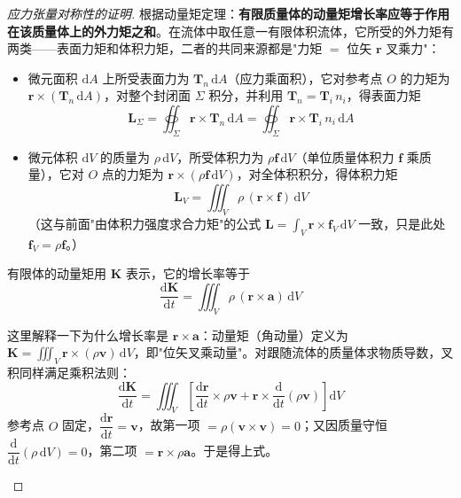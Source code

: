 \begin{proof}[应力张量对称性的证明]
	根据动量矩定理：\textbf{有限质量体的动量矩增长率应等于作用在该质量体上的外力矩之和}。在流体中取任意一有限体积流体，它所受的外力矩有两类——表面力矩和体积力矩，二者的共同来源都是"力矩 $=$ 位矢 $\boldsymbol{r}$ 叉乘力"：
	\begin{itemize}
		\item 微元面积 $\mathrm{d}A$ 上所受表面力为 $\boldsymbol{T}_n\,\mathrm{d}A$（应力乘面积），它对参考点 $O$ 的力矩为 $\boldsymbol{r}\times(\boldsymbol{T}_n\,\mathrm{d}A)$，对整个封闭面 $\Sigma$ 积分，并利用 $\boldsymbol{T}_n=\boldsymbol{T}_i\,n_i$，得表面力矩
		      \begin{equation}\label{eq:surface-moment}
			      \boldsymbol{L}_\Sigma=\oiint_\Sigma\boldsymbol{r}\times\boldsymbol{T}_n\,\mathrm{d}A=\oiint_\Sigma\boldsymbol{r}\times\boldsymbol{T}_i\,n_i\,\mathrm{d}A
		      \end{equation}
		\item 微元体积 $\mathrm{d}V$ 的质量为 $\rho\,\mathrm{d}V$，所受体积力为 $\rho\boldsymbol{f}\,\mathrm{d}V$（单位质量体积力 $\boldsymbol{f}$ 乘质量），它对 $O$ 点的力矩为 $\boldsymbol{r}\times(\rho\boldsymbol{f}\,\mathrm{d}V)$，对全体积积分，得体积力矩
		      \begin{equation}\label{eq:volume-moment}
			      \boldsymbol{L}_V=\iiint_V\rho\,(\boldsymbol{r}\times\boldsymbol{f})\,\mathrm{d}V
		      \end{equation}
		      （这与前面"由体积力强度求合力矩"的公式 $\boldsymbol{L}=\int_V\boldsymbol{r}\times\boldsymbol{f}_V\,\mathrm{d}V$ 一致，只是此处 $\boldsymbol{f}_V=\rho\boldsymbol{f}$。）
	\end{itemize}

	有限体的动量矩用 $\boldsymbol{K}$ 表示，它的增长率等于
	\begin{equation}
		\frac{\mathrm{d}\boldsymbol{K}}{\mathrm{d}t}=\iiint_V\rho\,(\boldsymbol{r}\times\boldsymbol{a})\,\mathrm{d}V
	\end{equation}

	\begin{note}
		这里解释一下为什么增长率是 $\boldsymbol{r}\times\boldsymbol{a}$：动量矩（角动量）定义为 $\boldsymbol{K}=\iiint_V\boldsymbol{r}\times(\rho\boldsymbol{v})\,\mathrm{d}V$，即"位矢叉乘动量"。对跟随流体的质量体求物质导数，叉积同样满足乘积法则：
		\[
		\frac{\mathrm{d}\boldsymbol{K}}{\mathrm{d}t}=\iiint_V\left[\frac{\mathrm{d}\boldsymbol{r}}{\mathrm{d}t}\times\rho\boldsymbol{v}+\boldsymbol{r}\times\frac{\mathrm{d}}{\mathrm{d}t}(\rho\boldsymbol{v})\right]\mathrm{d}V
		\]
		参考点 $O$ 固定，$\dfrac{\mathrm{d}\boldsymbol{r}}{\mathrm{d}t}=\boldsymbol{v}$，故第一项 $=\rho(\boldsymbol{v}\times\boldsymbol{v})=0$；又因质量守恒 $\dfrac{\mathrm{d}}{\mathrm{d}t}(\rho\,\mathrm{d}V)=0$，第二项 $=\boldsymbol{r}\times\rho\boldsymbol{a}$。于是得上式。
	\end{note}


\end{proof}
